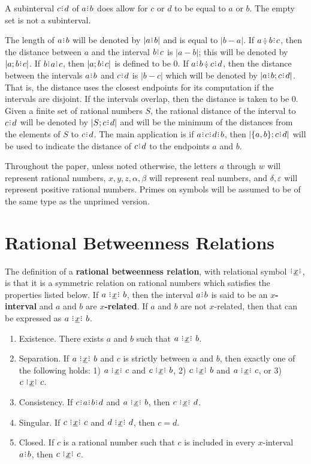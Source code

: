 \documentclass[12pt]{article}
\begin{document}
A subinterval $c \rint d$ of $a\rint b$ does allow for $c$ or $d$ to be equal to $a$ or $b$. The empty set is not a subinterval. 

The length of $a\rint b$ will be denoted by $|a\rint b|$ and is equal to $|b-a|$. If $a \betneq b \rint c$, then the distance between $a$ and the interval $b \rint c$ is $|a-b|$; this will be denoted by $|a; b\rint c|$. If $b\rint a\rint c$, then $|a; b\rint c|$ is defined to be $0$. If $a \rint b \betneq c \rint d$, then the distance between the intervals $a \rint b$  and $c \rint d$ is $|b-c|$ which will be denoted by $|a\rint b; c\rint d|$.  That is, the distance uses the closest endpoints for its computation if the intervals are disjoint. If the intervals overlap, then the distance is taken to be $0$. Given a finite set of rational numbers $S$, the rational distance of the interval to $c \rint d$ will be denoted by $|S; c \rint d|$ and will be the minimum of the distances from the elements of $S$ to $c \rint d$. The main application is if $a \rint c \rint d \rint b$, then $|\{a, b\}; c\rint d|$ will be used to indicate the distance of $c \rint d$ to the endpoints $a$ and $b$.

Throughout the paper, unless noted otherwise, the letters $a$ through $w$ will represent rational numbers, $x, y, z, \alpha, \beta$ will represent real numbers, and $\delta, \varepsilon$ will represent positive rational numbers. Primes on symbols will be assumed to be of the same type as the unprimed version. 

\section{Rational Betweenness Relations}


The definition of a \textbf{rational betweenness relation}, with relational symbol $\xrel$, is that it is a symmetric relation on rational numbers which satisfies the properties listed below. If $a \xrel b$, then the interval $a\rint b$ is said to be an \textbf{$x$-interval} and $a$ and $b$ are \textbf{$x$-related}. If $a$ and $b$ are not $x$-related, then that can be expressed as \sout{$a \xrel b$}.

\begin{enumerate}
    \item Existence. There exists $a$ and $b$ such that $a\xrel b$.
    \item Separation. If $a \xrel b$ and $c$ is strictly between $a$ and $b$, then exactly one of the following holds:  1) $a \xrel c$ and \sout{$c \xrel b$}, 2) $c \xrel b$ and \sout{$a \xrel c$}, or 3) $c \xrel c$. 
    \item Consistency. If $c \rint  a \rint  b \rint  d$ and $a \xrel b$, then $c \xrel d$. 
    \item Singular. If $c \xrel c$ and $d \xrel d$, then $c=d$. 
    \item Closed. If $c$ is a rational number such that $c$ is included in every $x$-interval $a\rint b$, then  $c \xrel c$. 
\end{enumerate}
\end{document}
